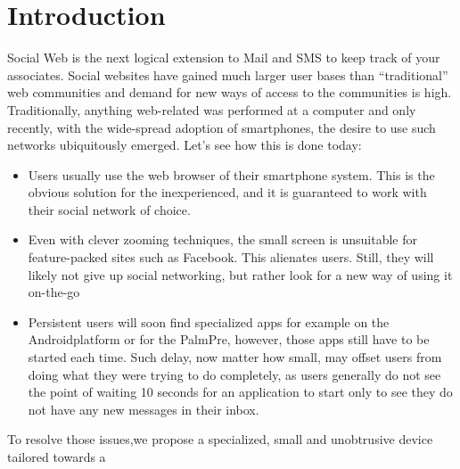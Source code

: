 %
%
%
\section{Introduction}
Social Web is the next logical extension to Mail and SMS to keep track of your associates. 
Social websites have gained much larger user bases than ``traditional'' web communities and demand
for new ways of access to the communities is high.
Traditionally, 
anything web-related was performed at a computer and only recently, with the wide-spread adoption of 
smartphones, the desire to use such networks ubiquitously emerged. Let's see how this is done today:
\begin{itemize}
  \item %
    Users usually 
    use the web browser of their smartphone system. This is the obvious solution for the inexperienced,
    and it is guaranteed to work with their social network of choice.
  \item Even with clever zooming techniques, the small screen is unsuitable for feature-packed sites such as Facebook\registered. 
    This alienates users. Still, they will likely not give up social networking, but rather look for a new 
    way of using it on-the-go
  \item Persistent users will soon find specialized apps for example on the Android\trademark platform or for the 
    Palm\registered Pre, however, 
    those apps still have to be started each time. Such delay, now matter how small, may offset users from doing what they were 
    trying to do completely, as users generally do not see the point of waiting 10 seconds for an application to start 
    only to see they do not have any new messages in their inbox.
\end{itemize}
To resolve those issues,we propose a specialized, small and unobtrusive device tailored towards a 
